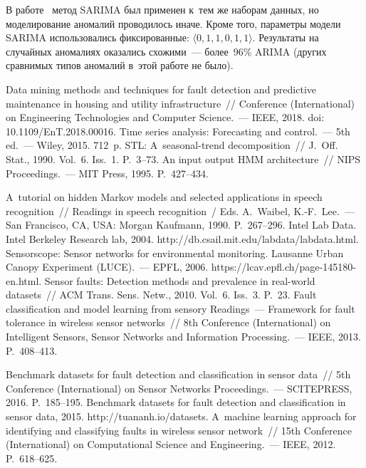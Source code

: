 \begin{multicols}{2}
      В работе~\cite{8-st} метод SARIMA был применен к~тем же наборам 
данных, но моделирование аномалий проводилось иначе. Кроме того, 
параметры модели SARIMA использовались фиксированные: $\langle 0, 1, 1, 0, 
1, 1\rangle$. Результаты на случайных аномалиях оказались схожими~--- 
более~96\% ARIMA (других сравнимых типов аномалий в~этой работе не 
было).
    
{\small\frenchspacing
 {%
 \begin{thebibliography}{99}
 Data mining methods and techniques for 
fault detection and predictive maintenance in housing and utility infrastructure~// Conference 
(International) on Engineering Technologies and Computer Science.~--- IEEE, 2018.
doi: 10.1109/EnT.2018.00016.
 Time series analysis: 
Forecasting and control.~--- 5th ed.~--- Wiley, 2015. 712~p.
 STL: A~seasonal-trend 
decomposition~// J.~Off. Stat., 1990. Vol.~6. Iss.~1. P.~3--73.
 An input output HMM architecture~//
NIPS Proceedings.~--- MIT Press, 1995. P.~427--434.

 A~tutorial on hidden Markov models and selected applications in speech 
recognition~// Readings in speech recognition~/
Eds. A.~Waibel, K.-F.~Lee.~--- San Francisco, CA, USA:
Morgan Kaufmann, 1990. P.~267--296.
 Intel Lab Data. Intel 
Berkeley Research lab, 2004. {\sf http://db.csail.mit.edu/labdata/labdata.html}.
Sensorscope: Sensor networks for environmental monitoring. Lausanne Urban Canopy Experiment 
(LUCE).~--- EPFL, 2006. {\sf https://lcav.epfl.ch/page-145180-en.html}.
 Sensor faults: Detection methods and prevalence 
in real-world datasets~// ACM Trans. Sens. Netw., 2010. Vol.~6. Iss.~3. 
P.~23. 
 Fault classification and model learning from sensory 
Readings~---
Framework for fault tolerance in wireless sensor networks~// 
8th Conference (International) on 
Intelligent Sensors, 
Sensor Networks and Information Processing.~--- IEEE, 
2013. P.~408--413.
{

}
 Benchmark datasets for fault detection and 
classification in sensor data~// 5th Conference (International) on Sensor Networks  
Proceedings.~--- SCITEPRESS, 2016. P.~185--195.
 Benchmark datasets for fault detection and 
classification in sensor data, 2015. {\sf http://tuananh.io/datasets}.
 A~machine learning approach for identifying and 
classifying faults in wireless sensor network~// 
 15th Conference (International) on
Computational Science and Engineering.~--- IEEE, 2012. P.~618--625.


\end{thebibliography}}}
\end{multicols}
